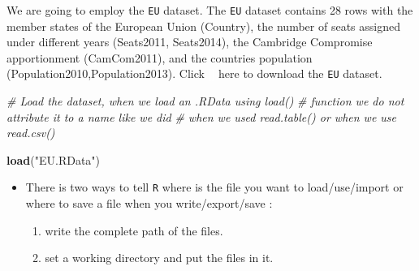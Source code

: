 \documentclass[]{book}
\newenvironment{Shaded}{\begin{snugshade}}{\end{snugshade}}
\newcommand{\KeywordTok}[1]{\textcolor[rgb]{0.13,0.29,0.53}{\textbf{#1}}}
\newcommand{\StringTok}[1]{\textcolor[rgb]{0.31,0.60,0.02}{#1}}
\newcommand{\CommentTok}[1]{\textcolor[rgb]{0.56,0.35,0.01}{\textit{#1}}}
\newcommand{\NormalTok}[1]{#1}
\providecommand{\tightlist}{%
  \setlength{\itemsep}{0pt}\setlength{\parskip}{0pt}}
\newenvironment{rmdblock}[1]
  {\begin{shaded*}
  \begin{itemize}
  \renewcommand{\labelitemi}{
    \raisebox{-.7\height}[0pt][0pt]{
      {\setkeys{Gin}{width=2em,keepaspectratio}\texttt{[image: img/icons/\#1]}}
    }
  }
  \item
  }
  {
  \end{itemize}
  \end{shaded*}
  }
\newenvironment{rmdinsight}
  {\begin{rmdblock}{insight}}
  {\end{rmdblock}}
\theoremstyle{definition}
\theoremstyle{definition}
\theoremstyle{definition}
\theoremstyle{remark}
\begin{document}
We are going to employ the \texttt{EU} dataset. The \texttt{EU} dataset
contains 28 rows with the member states of the European Union (Country),
the number of seats assigned under different years (Seats2011,
Seats2014), the Cambridge Compromise apportionment (CamCom2011), and the
countries population (Population2010,Population2013). Click
\textcolor{white}{[}\faTable\textcolor{white}{]} here to download the
\texttt{EU} dataset.

\begin{Shaded}
\begin{Highlighting}[]
\CommentTok{# Load the dataset, when we load an .RData using load()}
\CommentTok{# function we do not attribute it to a name like we did}
\CommentTok{# when we used read.table() or when we use read.csv()}

\KeywordTok{load}\NormalTok{(}\StringTok{"EU.RData"}\NormalTok{)}
\end{Highlighting}
\end{Shaded}

\begin{rmdinsight}
There is two ways to tell \texttt{R} where is the file you want to
load/use/import or where to save a file when you write/export/save :

\begin{enumerate}
\def\labelenumi{\arabic{enumi}.}
\tightlist
\item
  write the complete path of the files.
\item
  set a working directory and put the files in it.
\end{enumerate}
\end{rmdinsight}
\end{document}
